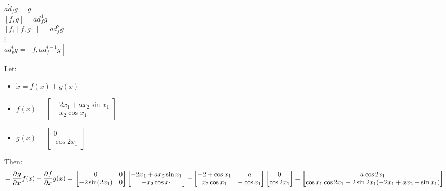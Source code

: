 \nt
{
    $a \dot{d}_fg=g$\\
    $[f,g] = ad^{1}_fg$ \\
    $[f,[f,g]] = ad_f^{2}g$ \\
    $\vdots$\\
    $ad_v^{i}g = [f, ad_f^{i-1}g]$

}
\ex{}
{
    Let:\\
    \begin{itemize}
            \item $\dot{x} = f(x) + g(x)$
            \item $f(x) = 
                \begin{bmatrix}
                    -2x_1+ax_2\sin{x_1}  \\
                    -x_2\cos{x_1}
            \end{bmatrix}$ \\
        \item $g(x) = 
            \begin{bmatrix}
            0  \\
    \cos{2x_1}
        \end{bmatrix}$
    \end{itemize}
    Then:
    \begin{equation}
        [f,g] = \pdv{g}{x}f(x) - \pdv{f}{x}g(x) =\newline
        \begin{bmatrix}
            0 & 0 \\
            -2\sin(2x_1) & 0
        \end{bmatrix}
                \begin{bmatrix}
                    -2x_1+ax_2\sin{x_1}  \\
                    -x_2\cos{x_1}
            \end{bmatrix} 
            - \begin{bmatrix}
                -2+\cos{x_1}  & a \\
                x_2\cos{x_1} & -\cos{x_1}
            \end{bmatrix}
            \begin{bmatrix}
            0  \\
    \cos{2x_1}
        \end{bmatrix} = \begin{bmatrix}
        a \cos{2x_1}  \\
        \cos{x_1}\cos{2x_1}-2\sin{2x_1}(-2x_1+ax_2+\sin{x_1})
        \end{bmatrix}
    \end{equation}
}

